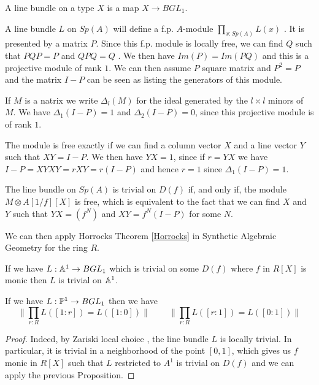 A line bundle on a type $X$ is a map $X\rightarrow BGL_1$.


\medskip

 A line bundle $L$ on $Sp(A)$ will define a f.p. $A$-module $\prod_{x:Sp(A)}L(x)$ \cite{draft}.
It is presented by a matrix $P$.
Since this f.p. module is locally free, we can find $Q$ such that $PQP = P$ and
$QPQ = Q$ \cite{lombardi-quitte}. We then have $Im(P) = Im(PQ)$ and this is a projective module of rank $1$. We can then assume $P$ square matrix and
$P^2 = P$ and the matrix $I-P$ can  be seen as listing the generators of this module.

If $M$ is a natrix we write $\Delta_l(M)$ for the ideal generated by the $l\times l$ minors of
$M$. We have $\Delta_1(I-P) = 1$ and $\Delta_2(I-P) = 0$, since this projective module is of rank $1$.

The module is free exactly if we can find a column vector $X$ and a line vector $Y$ such that
$XY = I-P$. We then have $YX = 1$, since if $r = YX$ we have $I-P = XYXY = rXY = r(I-P)$ and
hence $r = 1$ since $\Delta_1(I-P) = 1$.



\medskip


The line bundle on $Sp(A)$ is trivial on $D(f)$ if, and only if, the module $M\otimes A[1/f][X]$ is free, which
is equivalent to the fact that we can find $X$ and $Y$ such that $YX = (f^N)$ and $XY = f^N(I-P)$ for some $N$.

We can then apply Horrocks Theorem \ref{Horrocks} in Synthetic Algebraic Geometry for the ring $R$.

\begin{proposition}
  If we have $L:\mathbb{A}^1\rightarrow BGL_1$ which is trivial on some $D(f)$ where $f$ in $R[X]$ is monic
  then $L$ is trivial on $\mathbb{A}^1$.
\end{proposition}

\begin{corollary}\label{c1}
  If we have $L:\mathbb{P}^1\rightarrow BGL_1$ then we have
  $$\|{\prod_{r:R}L([1:r]) = L([1:0])}\|\,\,\,\,\,\,\,\,\,\,\,\,\,\|{\prod_{r:R}L([r:1]) = L([0:1])}\|$$
\end{corollary}

\begin{proof}
Indeed, by Zariski local choice \cite{draft}, the line bundle $L$ is locally trivial. In particular, it is trivial
in a neighborhood of the point $[0,1]$, which gives us $f$ monic in $R[X]$ such that $L$ restricted to $A^1$
is trivial on $D(f)$ and we can apply the previous Proposition.
\end{proof}


